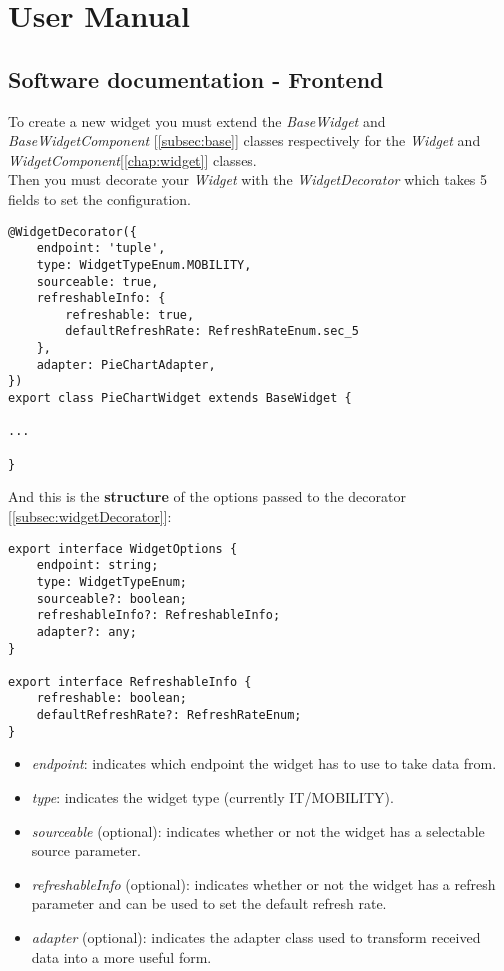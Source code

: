 \chapter{User Manual}
\section{Software documentation - Frontend}
To create a new widget you must extend the \textit{BaseWidget} and \textit{BaseWidgetComponent} [\ref{subsec:base}] classes respectively for the \textit{Widget} and \textit{WidgetComponent}[\ref{chap:widget}] classes.\\
Then you must decorate your \textit{Widget} with the \textit{WidgetDecorator} which takes 5 fields to set the configuration.
\begin{lstlisting}[caption={PieChartWidget example}, style=javaScriptCode]
@WidgetDecorator({
    endpoint: 'tuple', 
    type: WidgetTypeEnum.MOBILITY,
    sourceable: true,
    refreshableInfo: {
        refreshable: true,
        defaultRefreshRate: RefreshRateEnum.sec_5
    },
    adapter: PieChartAdapter,
})
export class PieChartWidget extends BaseWidget {

...

}
\end{lstlisting}
And this is the \textbf{structure} of the options passed to the decorator [\ref{subsec:widgetDecorator}]:
\begin{lstlisting}[caption={Structure of WidgetOptions}, style=javaScriptCode]
export interface WidgetOptions {
    endpoint: string;
    type: WidgetTypeEnum;
    sourceable?: boolean;
    refreshableInfo?: RefreshableInfo; 
    adapter?: any;
}

export interface RefreshableInfo {
    refreshable: boolean;
    defaultRefreshRate?: RefreshRateEnum;
}
\end{lstlisting}
\begin{itemize}
    \item \textit{endpoint}: indicates which endpoint the widget has to use to take data from.
    \item \textit{type}: indicates the widget type (currently IT/MOBILITY).
    \item \textit{sourceable} (optional): indicates whether or not the widget has a selectable source parameter.
    \item \textit{refreshableInfo} (optional): indicates whether or not the widget has a refresh parameter and can be used to set the default refresh rate.
    \item \textit{adapter} (optional): indicates the adapter class used to transform received data into a more useful form.
\end{itemize}
